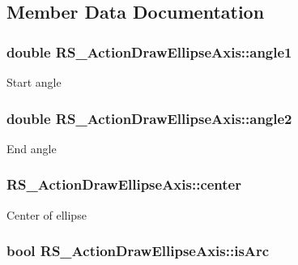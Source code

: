 \subsection{Member Data Documentation}
\hypertarget{classRS__ActionDrawEllipseAxis_a9d154b2c662efb24c3957fcdcf28dc46}{
\subsubsection[{angle1}]{\setlength{\rightskip}{0pt plus 5cm}double R\-S\-\_\-\-Action\-Draw\-Ellipse\-Axis\-::angle1\hspace{0.3cm}{\ttfamily [protected]}}}\label{classRS__ActionDrawEllipseAxis_a9d154b2c662efb24c3957fcdcf28dc46}
Start angle \hypertarget{classRS__ActionDrawEllipseAxis_a55342fe33bf057f5542ebad5ecfdb74b}{
\subsubsection[{angle2}]{\setlength{\rightskip}{0pt plus 5cm}double R\-S\-\_\-\-Action\-Draw\-Ellipse\-Axis\-::angle2\hspace{0.3cm}{\ttfamily [protected]}}}\label{classRS__ActionDrawEllipseAxis_a55342fe33bf057f5542ebad5ecfdb74b}
End angle \hypertarget{classRS__ActionDrawEllipseAxis_a2bdbf23b41a18e11bb86588aedf3135d}{
\subsubsection[{center}]{ R\-S\-\_\-\-Action\-Draw\-Ellipse\-Axis\-::center\hspace{0.3cm}{\ttfamily [protected]}}}\label{classRS__ActionDrawEllipseAxis_a2bdbf23b41a18e11bb86588aedf3135d}
Center of ellipse \hypertarget{classRS__ActionDrawEllipseAxis_a325339ed6e8fad3e25930f0bc80b8264}{
\subsubsection[{is\-Arc}]{\setlength{\rightskip}{0pt plus 5cm}bool R\-S\-\_\-\-Action\-Draw\-Ellipse\-Axis\-::is\-Arc\hspace{0.3cm}{\ttfamily [protected]}}}\label{classRS__ActionDrawEllipseAxis_a325339ed6e8fad3e25930f0bc80b8264}
